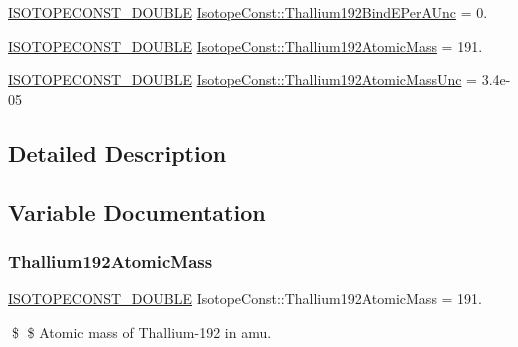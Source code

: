 \begin{DoxyCompactItemize}
\mbox{\hyperlink{group___isotope_const-_macros_ga8f45a7272ce02c0b4c65c44636ed719a}{I\+S\+O\+T\+O\+P\+E\+C\+O\+N\+S\+T\+\_\+\+D\+O\+U\+B\+LE}} \mbox{\hyperlink{group___isotope_const-_thallium-_tl192_gadec05fefe86c7c4f53c2d586fb426390}{Isotope\+Const\+::\+Thallium192\+Bind\+E\+Per\+A\+Unc}} = 0.
\item 
\mbox{\hyperlink{group___isotope_const-_macros_ga8f45a7272ce02c0b4c65c44636ed719a}{I\+S\+O\+T\+O\+P\+E\+C\+O\+N\+S\+T\+\_\+\+D\+O\+U\+B\+LE}} \mbox{\hyperlink{group___isotope_const-_thallium-_tl192_ga0125c7d968de66320ecc26da3ae196f0}{Isotope\+Const\+::\+Thallium192\+Atomic\+Mass}} = 191.
\item 
\mbox{\hyperlink{group___isotope_const-_macros_ga8f45a7272ce02c0b4c65c44636ed719a}{I\+S\+O\+T\+O\+P\+E\+C\+O\+N\+S\+T\+\_\+\+D\+O\+U\+B\+LE}} \mbox{\hyperlink{group___isotope_const-_thallium-_tl192_ga9e6d14e35230d51ed83b0bce65def494}{Isotope\+Const\+::\+Thallium192\+Atomic\+Mass\+Unc}} = 3.\+4e-\/05
\end{DoxyCompactItemize}


\subsection{Detailed Description}


\subsection{Variable Documentation}
\mbox{\label{group___isotope_const-_thallium-_tl192_ga0125c7d968de66320ecc26da3ae196f0}} 
\subsubsection{\texorpdfstring{Thallium192\+Atomic\+Mass}{Thallium192AtomicMass}}
{\footnotesize\ttfamily \mbox{\hyperlink{group___isotope_const-_macros_ga8f45a7272ce02c0b4c65c44636ed719a}{I\+S\+O\+T\+O\+P\+E\+C\+O\+N\+S\+T\+\_\+\+D\+O\+U\+B\+LE}} Isotope\+Const\+::\+Thallium192\+Atomic\+Mass = 191.}

\$ \$ Atomic mass of Thallium-\/192 in amu. \mbox{\label{group___isotope_const-_thallium-_tl192_ga9e6d14e35230d51ed83b0bce65def494}} 
